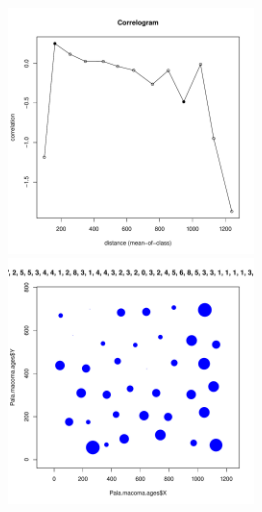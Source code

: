 \begin{figure}[h]
	\begin{minipage}[b]{.46\linewidth}
	\begin{center}
		\includegraphics[width=65mm]{../Barenc_Sea/distribution_Moran/Pala_macoma_age_N8_.pdf}
	\end{center}
	\end{minipage}
	\hfil %
	\begin{minipage}[b]{.46\linewidth}
	\begin{center}
		\includegraphics[width=65mm]{../Barenc_Sea/distribution_Moran/Pala_macoma_age_bubb_N8_.pdf}
	\end{center}
	\end{minipage}

	\end{figure}




